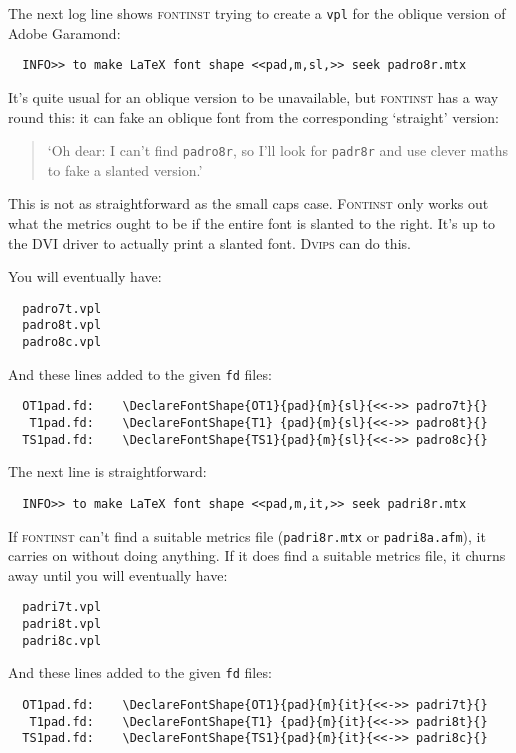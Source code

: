\documentclass[a4paper]{ltxguide}
\newcommand*{\setfilename}[1]{\texttt{#1}}
\newcommand*{\setpackagename}[1]{\textsc{#1}}
\newcommand{\Dvips}   {\setpackagename{Dvips}\xspace}
\newcommand{\fontinst}{\setpackagename{font\-inst}\xspace}
\newcommand{\Fontinst}{\setpackagename{Font\-inst}\xspace}
\newcommand{\fd} {\setfilename{fd}\xspace}
\newcommand{\vpl}{\setfilename{vpl}\xspace}
\begin{document}
The next log line shows \fontinst trying to create a \vpl for the
oblique version of Adobe Garamond:
\begin{verbatim}
  INFO>> to make LaTeX font shape <<pad,m,sl,>> seek padro8r.mtx
\end{verbatim}
It's quite usual for an oblique version to be unavailable, but
\fontinst has a way round this: it can fake an oblique font from the
corresponding `straight' version:
\begin{quote}
  `Oh dear: I can't find \texttt{padro8r}, so I'll look for
  \texttt{padr8r} and use clever maths to fake a slanted version.'
\end{quote}
This is not as straightforward as the small caps case.  \Fontinst
only works out what the metrics ought to be if the entire font is
slanted to the right.  It's up to the DVI driver to actually print a
slanted font.  \Dvips can do this.

You will eventually have:
\begin{verbatim}
  padro7t.vpl
  padro8t.vpl
  padro8c.vpl
\end{verbatim}
And these lines added to the given \fd files:
\begin{verbatim}
  OT1pad.fd:    \DeclareFontShape{OT1}{pad}{m}{sl}{<<->> padro7t}{}
   T1pad.fd:    \DeclareFontShape{T1} {pad}{m}{sl}{<<->> padro8t}{}
  TS1pad.fd:    \DeclareFontShape{TS1}{pad}{m}{sl}{<<->> padro8c}{}
\end{verbatim}

The next line is straightforward:
\begin{verbatim}
  INFO>> to make LaTeX font shape <<pad,m,it,>> seek padri8r.mtx
\end{verbatim}
If \fontinst can't find a suitable metrics file (\texttt{padri8r.mtx}
or \texttt{padri8a.afm}), it carries on without doing anything.  If it
does find a suitable metrics file, it churns away until you will
eventually have:
\begin{verbatim}
  padri7t.vpl
  padri8t.vpl
  padri8c.vpl
\end{verbatim}
And these lines added to the given \fd files:
\begin{verbatim}
  OT1pad.fd:    \DeclareFontShape{OT1}{pad}{m}{it}{<<->> padri7t}{}
   T1pad.fd:    \DeclareFontShape{T1} {pad}{m}{it}{<<->> padri8t}{}
  TS1pad.fd:    \DeclareFontShape{TS1}{pad}{m}{it}{<<->> padri8c}{}
\end{verbatim}
\end{document}
